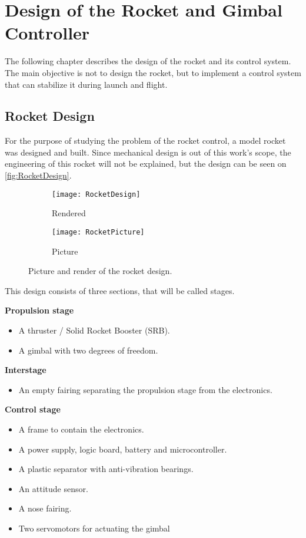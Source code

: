 
\chapter{Design of the Rocket and Gimbal Controller}
\graphicspath{{figures/rocket/Design/}}
The following chapter describes the design of the rocket and its control system. The main objective is not to design the rocket, but to implement a control system that can stabilize it during launch and flight. 

\section{Rocket Design}
For the purpose of studying the problem of the rocket control, a model rocket was designed and built. Since mechanical design is out of this work's scope, the engineering of this rocket will not be explained, but the design can be seen on \autoref{fig:RocketDesign}.
\begin{figure}[htbp]
\centering
\begin{subfigure}{0.4\textwidth}
\texttt{[image: RocketDesign]}
\caption{Rendered}
\label{fig:RocketRender}
\end{subfigure}
\begin{subfigure}{0.415\textwidth}
\texttt{[image: RocketPicture]}
\caption{Picture}
\label{fig:RocketPicture}
\end{subfigure}
\caption{Picture and render of the rocket design.}
\label{fig:RocketDesign}
\end{figure}
This design consists of three sections, that will be called stages.

\textbf{Propulsion stage}
\begin{itemize}[noitemsep]
	\item {A thruster / Solid Rocket Booster (SRB).}
	\item {A gimbal with two degrees of freedom.}
\end{itemize}

\textbf{Interstage}
\begin{itemize}[noitemsep]
	\item {An empty fairing separating the propulsion stage from the electronics.}
\end{itemize}
\textbf{Control stage}
\begin{itemize}[noitemsep]
	\item A frame to contain the electronics.
	\item A power supply, logic board, battery and microcontroller.
	\item A plastic separator with anti-vibration bearings.
	\item An attitude sensor.
	\item A nose fairing.
	\item {Two servomotors for actuating the gimbal}
\end{itemize}

